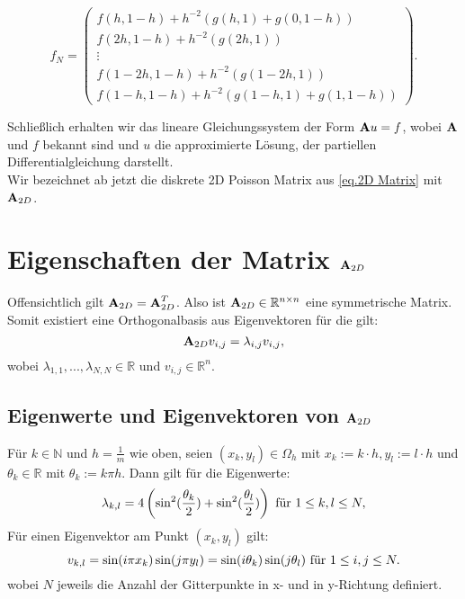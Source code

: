 \begin{equation}
f_{N} = 
\begin{pmatrix}
f(h,1-h) + h^{-2}(g(h,1)+g(0,1-h)) \\
f(2h,1-h) + h^{-2}(g(2h,1)) \\
\vdots \\
f(1-2h,1-h) + h^{-2}(g(1-2h,1)) \\
f(1-h,1-h) + h^{-2}(g(1-h,1)+g(1,1-h))
\end{pmatrix}.
\end{equation}

Schließlich erhalten wir das lineare Gleichungssystem der Form ${\textbf{A}}u = f$, wobei ${\textbf{A}}$ und $f$ bekannt sind und $u$ die approximierte Lösung, der partiellen Differentialgleichung darstellt.\\
Wir bezeichnet ab jetzt die diskrete 2D Poisson Matrix aus \autoref{eq.2D Matrix} mit ${\textbf{A}}_{2D}$.

\section{Eigenschaften der Matrix ${\textbf{A}}_{2D}$}\label{s.Eigenwerte und Eigenvektoren}

Offensichtlich gilt ${\textbf{A}}_{2D} = {\textbf{A}}_{2D}^{T}$. Also ist ${\textbf{A}}_{2D} \in \mathbb{R}^{n \times n}$ eine symmetrische Matrix. Somit existiert eine Orthogonalbasis aus Eigenvektoren für die gilt:
\begin{equation}
{\textbf{A}}_{2D}v_{i,j} = \lambda_{i,j} v_{i,j},
\end{equation}
wobei $\lambda_{1,1},...,\lambda_{N,N} \in \mathbb{R}$ und $v_{i,j} \in \mathbb{R}^{n}$.

\subsection{Eigenwerte und Eigenvektoren von ${\textbf{A}}_{2D}$}\label{ss.Eigenwerte und Eigenvektoren}

Für $k \in \mathbb{N}$ und $h = \frac {1} {m}$ wie oben, seien $(x_{k},y_{l}) \in \Omega_{h}$ mit $x_{k} := k \cdot h, y_{l} := l \cdot h$ und $\theta_{k} \in \mathbb{R}$ mit $\theta_{k} := k \pi h$. Dann gilt für die Eigenwerte:
\begin{equation}
\lambda_{k,l} = 4 \left(\sin^{2}(\frac {\theta_{k}} {2}) + \sin^{2}(\frac {\theta_{l}} {2}) \right) \textnormal{ für } 1 \le k,l \le N,\label{eq.Eigenwerte}
\end{equation}
Für einen Eigenvektor am Punkt $(x_{k},y_{l})$ gilt:
\begin{equation}
v_{k,l} = \sin(i \pi x_{k}) \sin(j \pi y_{l}) = \sin(i\theta_{k}) \sin(j\theta_{l}) \textnormal{ für } 1 \le i,j \le N.
\end{equation}
wobei $N$ jeweils die Anzahl der Gitterpunkte in x- und in y-Richtung definiert.


